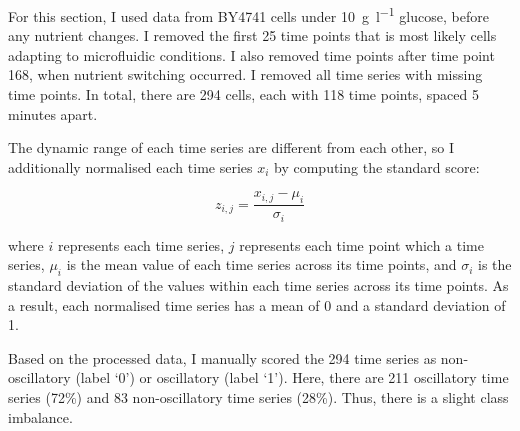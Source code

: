 
For this section, I used data from BY4741 cells under \SI{10}{\gram~\litre^{-1}} glucose, before any nutrient changes.
I removed the first 25 time points that is most likely cells adapting to microfluidic conditions.
I also removed time points after time point 168, when nutrient switching occurred.
I removed all time series with missing time points.
In total, there are 294 cells, each with 118 time points, spaced 5 minutes apart.




The dynamic range of each time series are different from each other, so I additionally normalised each time series $x_{i}$ by computing the standard score:

\begin{equation}
  \label{eq:analysis-stdscore}
  z_{i,j} = \frac{x_{i,j} - \mu_{i}}{\sigma_{i}}
\end{equation}

where $i$ represents each time series, $j$ represents each time point which a time series, $\mu_{i}$ is the mean value of each time series across its time points, and $\sigma_{i}$ is the standard deviation of the values within each time series across its time points.
As a result, each normalised time series has a mean of 0 and a standard deviation of 1.


Based on the processed data, I manually scored the 294 time series as non-oscillatory (label `0') or oscillatory (label `1').
Here, there are 211 oscillatory time series (72\%) and 83 non-oscillatory time series (28\%).
Thus, there is a slight class imbalance.

